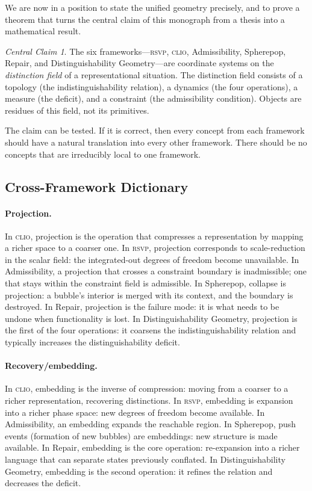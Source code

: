 \documentclass[12pt, letterpaper]{article}
\theoremstyle{remark}
\newtheorem*{claim}{Central Claim}
\newcommand{\rsvp}{\textsc{rsvp}}
\newcommand{\clio}{\textsc{clio}}
\begin{document}
We are now in a position to state the unified geometry precisely, and to
prove a theorem that turns the central claim of this monograph from a
thesis into a mathematical result.

\begin{claim}
The six frameworks---\rsvp{}, \clio{}, Admissibility, Spherepop, Repair,
and Distinguishability Geometry---are coordinate systems on the
\emph{distinction field} of a representational situation.  The distinction
field consists of a topology (the indistinguishability relation), a dynamics
(the four operations), a measure (the deficit), and a constraint (the
admissibility condition).  Objects are residues of this field, not its
primitives.
\end{claim}

The claim can be tested.  If it is correct, then every concept from each
framework should have a natural translation into every other framework.
There should be no concepts that are irreducibly local to one framework.

\subsection{Cross-Framework Dictionary}

\paragraph{Projection.}
In \clio{}, projection is the operation that compresses a representation
by mapping a richer space to a coarser one.  In \rsvp{}, projection
corresponds to scale-reduction in the scalar field: the integrated-out
degrees of freedom become unavailable.  In Admissibility, a projection that
crosses a constraint boundary is inadmissible; one that stays within the
constraint field is admissible.  In Spherepop, collapse is projection: a
bubble's interior is merged with its context, and the boundary is destroyed.
In Repair, projection is the failure mode: it is what needs to be undone
when functionality is lost.  In Distinguishability Geometry, projection is
the first of the four operations: it coarsens the indistinguishability
relation and typically increases the distinguishability deficit.

\paragraph{Recovery/embedding.}
In \clio{}, embedding is the inverse of compression: moving from a coarser
to a richer representation, recovering distinctions.  In \rsvp{}, embedding
is expansion into a richer phase space: new degrees of freedom become
available.  In Admissibility, an embedding expands the reachable region.
In Spherepop, push events (formation of new bubbles) are embeddings: new
structure is made available.  In Repair, embedding is the core operation:
re-expansion into a richer language that can separate states previously
conflated.  In Distinguishability Geometry, embedding is the second operation:
it refines the relation and decreases the deficit.
\end{document}
